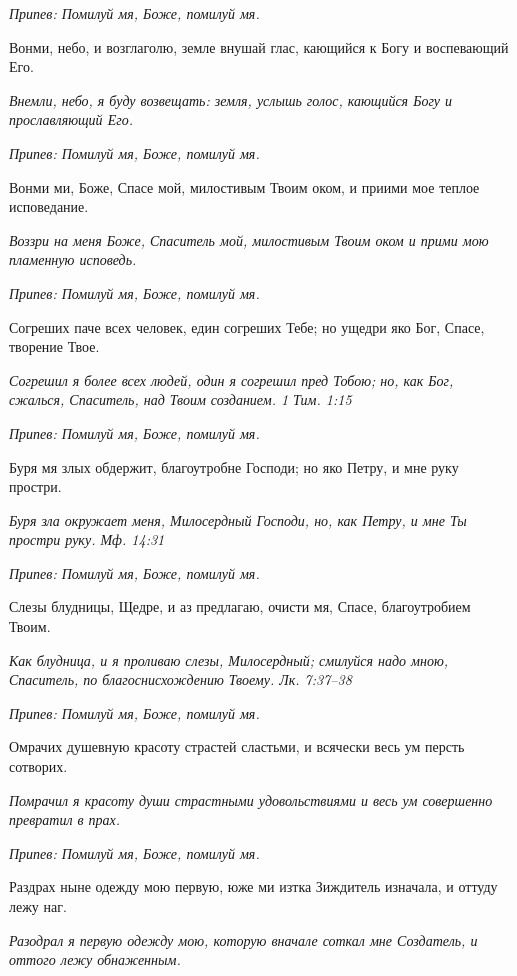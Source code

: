 \itshape Припев:\normalfont{} Помилуй мя, Боже, помилуй мя.


Вонми, небо, и возглаголю, земле внушай глас, кающийся к Богу и воспевающий Его.


\itshape Внемли, небо, я буду возвещать: земля, услышь голос, кающийся Богу и прославляющий Его.\normalfont{}


\itshape Припев:\normalfont{} Помилуй мя, Боже, помилуй мя.


Вонми ми, Боже, Спасе мой, милостивым Твоим оком, и приими мое теплое исповедание.


\itshape Воззри на меня Боже, Спаситель мой, милостивым Твоим оком и прими мою пламенную исповедь.\normalfont{}


\itshape Припев:\normalfont{} Помилуй мя, Боже, помилуй мя.


Согреших паче всех человек, един согреших Тебе; но ущедри яко Бог, Спасе, творение Твое.


\itshape Согрешил я более всех людей, один я согрешил пред Тобою; но, как Бог, сжалься, Спаситель, над Твоим созданием. 1 Тим. 1:15\normalfont{}


\itshape Припев:\normalfont{} Помилуй мя, Боже, помилуй мя.


Буря мя злых обдержит, благоутробне Господи; но яко Петру, и мне руку простри.


\itshape Буря зла окружает меня, Милосердный Господи, но, как Петру, и мне Ты простри руку. Мф. 14:31\normalfont{}


\itshape Припев:\normalfont{} Помилуй мя, Боже, помилуй мя.


Слезы блудницы, Щедре, и аз предлагаю, очисти мя, Спасе, благоутробием Твоим.


\itshape Как блудница, и я проливаю слезы, Милосердный; смилуйся надо мною, Спаситель, по благоснисхождению Твоему. Лк. 7:37–38\normalfont{}


\itshape Припев:\normalfont{} Помилуй мя, Боже, помилуй мя.


Омрачих душевную красоту страстей сластьми, и всячески весь ум персть сотворих.


\itshape Помрачил я красоту души страстными удовольствиями и весь ум совершенно превратил в прах.\normalfont{}


\itshape Припев:\normalfont{} Помилуй мя, Боже, помилуй мя.


Раздрах ныне одежду мою первую, юже ми изтка Зиждитель изначала, и оттуду лежу наг.


\itshape Разодрал я первую одежду мою, которую вначале соткал мне Создатель, и оттого лежу обнаженным.\normalfont{}


